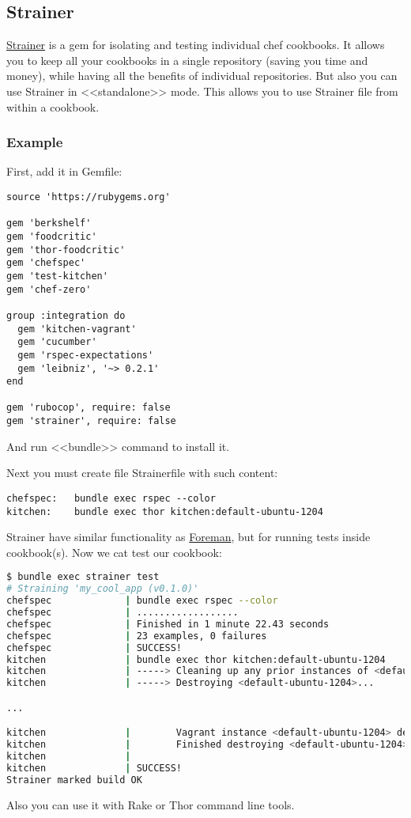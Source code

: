 \subsection{Strainer}

\href{https://github.com/customink/strainer}{Strainer} is a gem for isolating and testing individual chef cookbooks. It allows you to keep all your cookbooks in a single repository (saving you time and money), while having all the benefits of individual repositories. But also you can use Strainer in <<standalone>> mode. This allows you to use Strainer file from within a cookbook.

\subsubsection{Example}

First, add it in Gemfile:

\begin{lstlisting}[label=lst:testing-strainer1]
source 'https://rubygems.org'

gem 'berkshelf'
gem 'foodcritic'
gem 'thor-foodcritic'
gem 'chefspec'
gem 'test-kitchen'
gem 'chef-zero'

group :integration do
  gem 'kitchen-vagrant'
  gem 'cucumber'
  gem 'rspec-expectations'
  gem 'leibniz', '~> 0.2.1'
end

gem 'rubocop', require: false
gem 'strainer', require: false
\end{lstlisting}

And run <<bundle>> command to install it.

Next you must create file Strainerfile with such content:

\begin{lstlisting}[label=lst:testing-strainer2]
chefspec:   bundle exec rspec --color
kitchen:    bundle exec thor kitchen:default-ubuntu-1204
\end{lstlisting}

Strainer have similar functionality as \href{http://ddollar.github.io/foreman/}{Foreman}, but for running tests inside cookbook(s). Now we cat test our cookbook:

\begin{lstlisting}[language=Bash,label=lst:testing-strainer3]
$ bundle exec strainer test
# Straining 'my_cool_app (v0.1.0)'
chefspec             | bundle exec rspec --color
chefspec             | ..................
chefspec             | Finished in 1 minute 22.43 seconds
chefspec             | 23 examples, 0 failures
chefspec             | SUCCESS!
kitchen              | bundle exec thor kitchen:default-ubuntu-1204
kitchen              | -----> Cleaning up any prior instances of <default-ubuntu-1204>
kitchen              | -----> Destroying <default-ubuntu-1204>...

...

kitchen              |        Vagrant instance <default-ubuntu-1204> destroyed.
kitchen              |        Finished destroying <default-ubuntu-1204> (0m6.87s).
kitchen              |
kitchen              | SUCCESS!
Strainer marked build OK
\end{lstlisting}

Also you can use it with Rake or Thor command line tools.